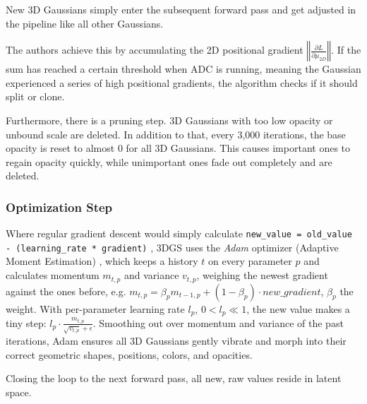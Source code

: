 New 3D Gaussians simply enter the subsequent forward pass and get adjusted in the pipeline like all other Gaussians.\newpage

The authors achieve this by accumulating the 2D positional gradient $\left\Vert{}\frac{\partial L}{\partial \mu_{2D}}\right\Vert{}$. If the sum has reached a certain threshold when ADC is running, meaning the Gaussian experienced a series of high positional gradients, the algorithm checks if it should split or clone.

Furthermore, there is a pruning step. 3D Gaussians with too low opacity or unbound scale are deleted. In addition to that, every 3,000 iterations, the base opacity is reset to almost $0$ for all 3D Gaussians. This causes important ones to regain opacity quickly, while unimportant ones fade out completely and are deleted.

\vspace{-5pt}
\subsubsection{Optimization Step}
Where regular gradient descent would simply calculate \texttt{new\_value = old\_value - \linebreak(learning\_rate * gradient)} \cite{thimm2025ML}, 3DGS uses the \textit{Adam} optimizer (Adaptive Moment Estimation) \cite{kingma2015iclr-adam}, which keeps a history $t$ on every parameter $p$ and calculates momentum $m_{t,p}$ and variance $v_{t,p}$, weighing the newest gradient against the ones before, e.g. $m_{t,p} = \beta_p m_{t-1,p} + (1 - \beta_p) \cdot new\_gradient$, $\beta_p$ the weight.
With per-parameter learning rate $l_p$, $0 < l_p \ll 1$, the new value makes a tiny step: $l_p \cdot \frac{m_{t,p}}{\sqrt{v_{t,p}} + \epsilon}$. 
Smoothing out over momentum and variance of the past iterations, Adam ensures all 3D Gaussians gently vibrate and morph into their correct geometric shapes, positions, colors, and opacities.

Closing the loop to the next forward pass, all new, raw values reside in latent space.
